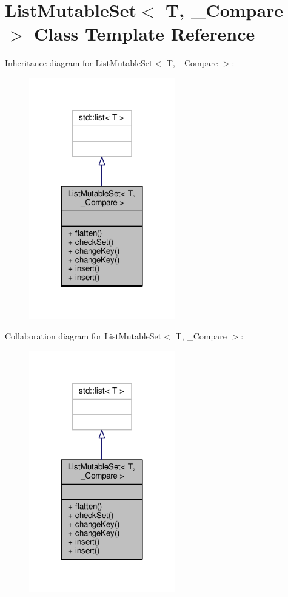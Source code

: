 \hypertarget{classListMutableSet}{}\section{List\+Mutable\+Set$<$ T, \+\_\+\+Compare $>$ Class Template Reference}
\label{classListMutableSet}


Inheritance diagram for List\+Mutable\+Set$<$ T, \+\_\+\+Compare $>$\+:
\nopagebreak
\begin{figure}[H]
\begin{center}
\leavevmode
\includegraphics[width=180pt]{d5/d26/classListMutableSet__inherit__graph}
\end{center}
\end{figure}


Collaboration diagram for List\+Mutable\+Set$<$ T, \+\_\+\+Compare $>$\+:
\nopagebreak
\begin{figure}[H]
\begin{center}
\leavevmode
\includegraphics[width=180pt]{d8/dca/classListMutableSet__coll__graph}
\end{center}
\end{figure}
